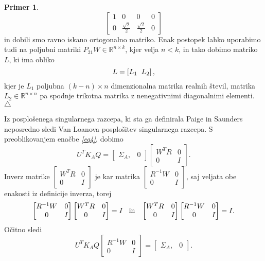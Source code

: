 \documentclass[mat1]{article}
\theoremstyle{definition}
\newtheorem{primer}{Primer}[section]
\newcommand\xqed[1]{%
  \leavevmode\unskip\penalty9999 \hbox{}\nobreak\hfill
  \quad\hbox{#1}}
\newcommand\demo{\xqed{$\triangle$}}
\begin{document}
\begin{primer}
$$\begin{bmatrix}
1 & 0 & 0 & 0 \\
0 & \frac{\sqrt{2}}{2} & \frac{\sqrt{2}}{2} & 0
\end{bmatrix}
$$
in dobili smo ravno iskano ortogonalno matriko. Enak postopek lahko uporabimo tudi na poljubni matriki $P_{21}W \in \mathbb{R}^{n \times k}$, kjer velja $n < k$, in tako dobimo matriko $L$, ki ima obliko 
$$ L =
\left[ L_1 \hspace{2mm} L_2 \right]
\text{,} $$ kjer je $L_1$ poljubna $(k-n) \times n$ dimenzionalna matrika realnih števil, matrika $L_2 \in \mathbb{R}^{n \times n}$ pa spodnje trikotna matrika z nenegativnimi diagonalnimi elementi. \demo
\end{primer}

Iz posplošenega singularnega razcepa, ki sta ga definirala Paige in Saunders neposredno sledi Van Loanova posplošitev singularnega razcepa. 
S preoblikovanjem enačbe \textit{\eqref{eq4}}, dobimo
$$U^T K_A Q = \left[\begin{array}{cc} \Sigma_A, & 0 \end{array}\right]
\begin{bmatrix}
W^TR & 0 \\
0 & I 
\end{bmatrix} \text{.}$$
Inverz matrike
$\begin{bmatrix}
W^TR & 0 \\
0 & I 
\end{bmatrix} $
je kar matrika 
$\begin{bmatrix}
R^{-1} W & 0 \\
0 & I 
\end{bmatrix} \text{,}$
saj veljata obe enakosti iz definicije inverza, torej
$$\begin{bmatrix}
R^{-1} W & 0 \\
0 & I 
\end{bmatrix}
\begin{bmatrix}
W^TR & 0 \\
0 & I 
\end{bmatrix}
= I \hspace{3mm}\text{in} \hspace{3mm}
\begin{bmatrix}
W^TR & 0 \\
0 & I 
\end{bmatrix}
\begin{bmatrix}
R^{-1} W & 0 \\
0 & I 
\end{bmatrix}
= I \text{.}$$
Očitno sledi
$$ U^T K_A Q
\begin{bmatrix}
R^{-1} W & 0 \\
0 & I 
\end{bmatrix}
=
\left[\begin{array}{cc} \Sigma_A, & 0 \end{array}\right] \text{.}
$$
\end{document}
